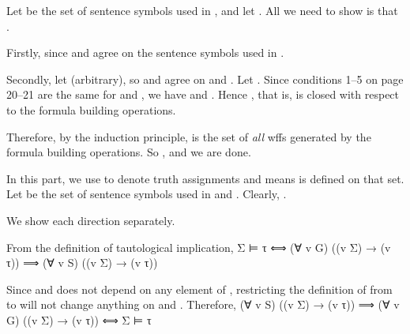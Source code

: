 		\stopitemize
	\stopexercise
	\startsolution
		\startframedtext [width=0.8\makeupwidth, align={flushleft, nonhyphenated, stretch, verytolerant}, frame=off]
		\startitemize [a]

			\item[uniqueness]
				Let  be the set of sentence symbols used in , and let . All we need to show is that .

				Firstly,  since  and  agree on the sentence symbols used in .

				Secondly, let  (arbitrary), so  and  agree on  and . Let . Since conditions 1–5 on page 20–21 are the same for  and , we have  and . Hence , that is,  is closed with respect to the formula building operations.

				Therefore, by the induction principle,  is the set of \emph{all} wffs generated by the formula building operations. So , and we are done.

			\item  In this part, we use  to denote truth assignments and  means  is defined on that set. Let  be the set of sentence symbols used in  and . Clearly, .

				We show each direction separately.

				  \qquad
				From the definition of tautological implication,
				\startformula  \startalign[n=3]
					\NC     \NC  Σ ⊨ τ  \NR
					\NC  ⟺  \NC  (∀ v  G) ((v \text{ satisfies } Σ) → (v  τ))  \NR
					\NC  ⟹  \NC  (∀ v  S) ((v  Σ) → (v  τ))  \NC  \text{[Part (\in[uniqueness])]}  \NR
				\stopalign  \stopformula
				
				\bold{(\m{⟸})}  \qquad
				Since  and  does not depend on any element of , restricting the definition of  from  to  will not change anything on  and . Therefore,
				\startformula  \startalign
					\NC     \NC  (∀ v  S) ((v \text{ satisfies } Σ) → (v  τ))  \NR
					\NC  ⟹  \NC  (∀ v  G) ((v \text{ satisfies } Σ) → (v  τ))  \NR
					\NC  ⟺  \NC  Σ ⊨ τ  \NR
				\stopalign  \stopformula
		\stopitemize
		\stopframedtext
	\stopsolution


